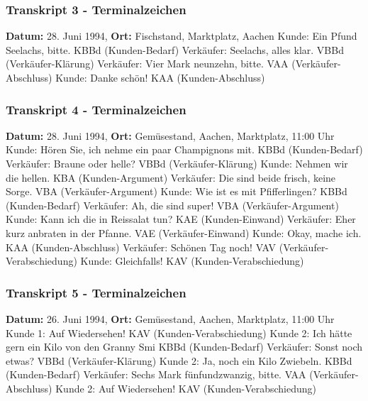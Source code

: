 \documentclass[
]{article}
\begin{document}
\subsubsection{\texorpdfstring{\textbf{Transkript 3 -
Terminalzeichen}}{Transkript 3 - Terminalzeichen}}\label{transkript-3---terminalzeichen}

\textbf{Datum:} 28. Juni 1994, \textbf{Ort:} Fischstand, Marktplatz,
Aachen\textbar{} Kunde: Ein Pfund Seelachs, bitte. \textbar{} KBBd
(Kunden-Bedarf) \textbar{} Verkäufer: Seelachs, alles klar. \textbar{}
VBBd (Verkäufer-Klärung) \textbar{} Verkäufer: Vier Mark neunzehn,
bitte. \textbar{} VAA (Verkäufer-Abschluss) \textbar{} Kunde: Danke
schön! \textbar{} KAA (Kunden-Abschluss)

\subsubsection{\texorpdfstring{\textbf{Transkript 4 -
Terminalzeichen}}{Transkript 4 - Terminalzeichen}}\label{transkript-4---terminalzeichen}

\textbf{Datum:} 28. Juni 1994, \textbf{Ort:} Gemüsestand, Aachen,
Marktplatz, 11:00 Uhr\textbar{} Kunde: Hören Sie, ich nehme ein paar
Champignons mit. \textbar{} KBBd (Kunden-Bedarf) \textbar{} Verkäufer:
Braune oder helle? \textbar{} VBBd (Verkäufer-Klärung) \textbar{} Kunde:
Nehmen wir die hellen. \textbar{} KBA (Kunden-Argument) \textbar{}
Verkäufer: Die sind beide frisch, keine Sorge. \textbar{} VBA
(Verkäufer-Argument) \textbar{} Kunde: Wie ist es mit Pfifferlingen?
\textbar{} KBBd (Kunden-Bedarf) \textbar{} Verkäufer: Ah, die sind
super! \textbar{} VBA (Verkäufer-Argument) \textbar{} Kunde: Kann ich
die in Reissalat tun? \textbar{} KAE (Kunden-Einwand) \textbar{}
Verkäufer: Eher kurz anbraten in der Pfanne. \textbar{} VAE
(Verkäufer-Einwand) \textbar{} Kunde: Okay, mache ich. \textbar{} KAA
(Kunden-Abschluss) \textbar{} Verkäufer: Schönen Tag noch! \textbar{}
VAV (Verkäufer-Verabschiedung) \textbar{} Kunde: Gleichfalls! \textbar{}
KAV (Kunden-Verabschiedung)

\subsubsection{\texorpdfstring{\textbf{Transkript 5 -
Terminalzeichen}}{Transkript 5 - Terminalzeichen}}\label{transkript-5---terminalzeichen}

\textbf{Datum:} 26. Juni 1994, \textbf{Ort:} Gemüsestand, Aachen,
Marktplatz, 11:00 Uhr\textbar{} Kunde 1: Auf Wiedersehen! \textbar{} KAV
(Kunden-Verabschiedung) \textbar{} Kunde 2: Ich hätte gern ein Kilo von
den Granny Smi\textbar{} KBBd (Kunden-Bedarf) \textbar{} Verkäufer:
Sonst noch etwas? \textbar{} VBBd (Verkäufer-Klärung) \textbar{} Kunde
2: Ja, noch ein Kilo Zwiebeln. \textbar{} KBBd (Kunden-Bedarf)
\textbar{} Verkäufer: Sechs Mark fünfundzwanzig, bitte. \textbar{} VAA
(Verkäufer-Abschluss) \textbar{} Kunde 2: Auf Wiedersehen! \textbar{}
KAV (Kunden-Verabschiedung)
\end{document}

